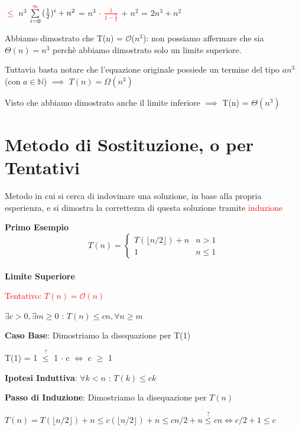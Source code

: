 \documentclass[../cheatSheetAlgoritmi.tex]{subfiles}
\begin{document}
\bigskip

\textcolor{red}{$\leq$} $n^{3}$ $\sum\limits_{i=0}^{\textcolor{red}{\infty}} {(\frac{1}{2})^{i}} + n^{2}$ =
$n^{3}$ $\cdot$ \textcolor{red}{$\frac{1}{1-\frac{1}{2}}$} + $n^{2}$ = $2n^{3} + n^2$

\begin{flushleft}
Abbiamo dimostrato che T(n) = $\mathcal{O}$($n^{3}$): non possiamo affermare che sia $\Theta(n) = n^{3}$ perchè abbiamo dimostrato solo un limite superiore.
\end{flushleft}
Tuttavia basta notare che l'equazione originale possiede un termine del tipo $an^{3}$ (con $a \in \mathbb{N}$) $\implies$ $T(n) = \Omega(n^{3})$

Visto che abbiamo dimostrato anche il limite inferiore $\implies$ T(n) = $\Theta(n^{3})$ 

\section{Metodo di Sostituzione, o per Tentativi}
Metodo in cui si cerca di indovinare una soluzione, in base alla propria esperienza, e si dimostra la correttezza di questa soluzione tramite \textcolor{red}{induzione}

\bigskip

\textbf{Primo Esempio}
	\begin{equation*}
  		T(n)=\begin{cases}
    		T(\lfloor n/2 \rfloor) + n & \text{$n > 1$}\\
    		1 & \text{$n \leq 1$}
  		\end{cases}
	\end{equation*}
\hfill\\
\textbf{Limite Superiore}

\textcolor{red}{Tentativo: $T(n) = \mathcal{O}(n)$}

$\exists c > 0, \exists m \geq 0$ : $T(n) \leq cn, \forall n \geq m$

\bigskip

\textbf{Caso Base}: Dimostriamo la disequazione per T(1)

T(1) = 1 $\stackrel{?}{\leq}$ 1 $\cdot$ c $\iff$ c $\geq$ 1

\bigskip

\textbf{Ipotesi Induttiva}: $\forall k < n$ : $T(k) \leq ck$

\textbf{Passo di Induzione}: Dimostriamo la disequazione per $T(n)$

$T(n) =  T(\lfloor n/2 \rfloor) + n \leq c( \lfloor n/2 \rfloor) + n \leq cn/2 + n \stackrel{?}{\leq} cn \iff  c/2 + 1 \leq c$
\end{document}
